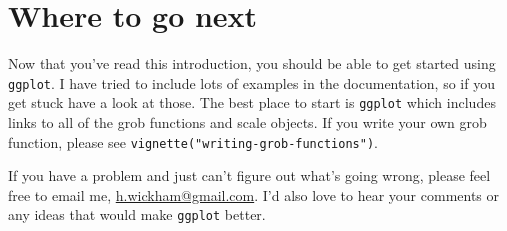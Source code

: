 \documentclass[]{article}
\begin{document}
\section{Where to go next}

Now that you've read this introduction, you should be able to get started using \texttt{ggplot}.  I have tried to include lots of examples in the documentation, so if you get stuck have a look at those.  The best place to start is \texttt{ggplot} which includes links to all of the grob functions and scale objects.  If you write your own grob function, please see \texttt{vignette("writing-grob-functions")}.

If you have a problem and just can't figure out what's going wrong, please feel free to email me, \href{mailto:h.wickham@gmail.com}{h.wickham@gmail.com}.  I'd also love to hear your comments or any ideas that would make \texttt{ggplot} better.



\end{document}
